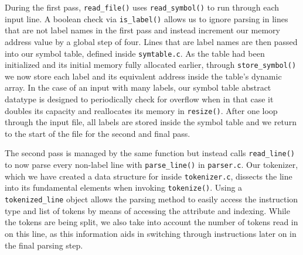 \documentclass[11pt]{article}
\begin{document}
During the first pass, \verb|read_file()| uses \verb|read_symbol()| to run through
each input line. A boolean check via \verb|is_label()| allows us to ignore parsing in
lines that are not label names in the first pass and instead increment our memory address
value by a global step of four. Lines that are label names are then passed into our
symbol table, defined inside \verb|symtable.c|. As the table had been initialized and
its initial memory fully allocated earlier, through \verb|store_symbol()| we now store each 
label and its equivalent address inside the table's dynamic array. In the case of an input
with many labels, our symbol table abstract datatype is designed to periodically check for
overflow when in that case it doubles its capacity and reallocates its memory in 
\verb|resize()|. After one loop through the input file, all labels are stored inside the
symbol table and we return to the start of the file for the second and final pass.

The second pass is managed by the same function but instead calls \verb|read_line()| to
now parse every non-label line with \verb|parse_line()| in \verb|parser.c|. Our tokenizer,
which we have created a data structure for inside \verb|tokenizer.c|, dissects the line into 
its fundamental elements when invoking \verb|tokenize()|. Using a  \verb|tokenized_line| 
object allows the parsing method to easily access the instruction type and list of tokens by 
means of accessing the attribute and indexing. While the tokens are being split, we also take 
into account the number of tokens read in on this line, as this information aids in switching 
through instructions later on in the final parsing step. 
\end{document}
